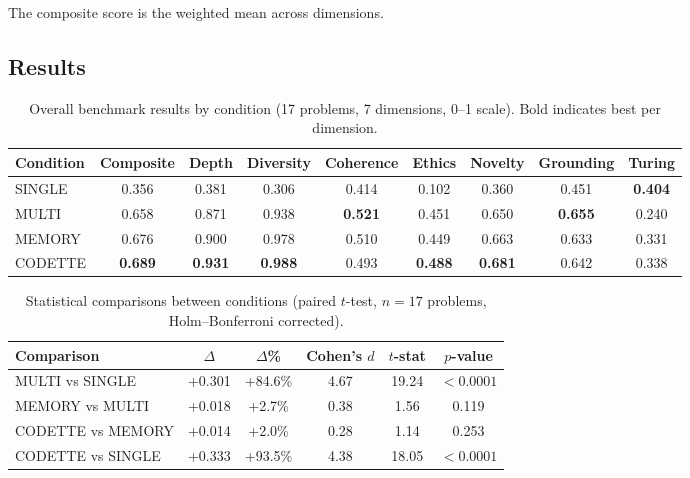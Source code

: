 \documentclass[11pt,a4paper]{article}
\begin{document}
The composite score is the weighted mean across dimensions.

\subsection{Results}

\begin{table}[ht]
\centering
\caption{Overall benchmark results by condition (17 problems, 7 dimensions, 0--1 scale). Bold indicates best per dimension.}
\label{tab:results}
\begin{tabular}{lcccccccc}
\toprule
\textbf{Condition} & \textbf{Composite} & \textbf{Depth} & \textbf{Diversity} & \textbf{Coherence} & \textbf{Ethics} & \textbf{Novelty} & \textbf{Grounding} & \textbf{Turing} \\
\midrule
SINGLE  & 0.356 & 0.381 & 0.306 & 0.414 & 0.102 & 0.360 & 0.451 & \textbf{0.404} \\
MULTI   & 0.658 & 0.871 & 0.938 & \textbf{0.521} & 0.451 & 0.650 & \textbf{0.655} & 0.240 \\
MEMORY  & 0.676 & 0.900 & 0.978 & 0.510 & 0.449 & 0.663 & 0.633 & 0.331 \\
CODETTE & \textbf{0.689} & \textbf{0.931} & \textbf{0.988} & 0.493 & \textbf{0.488} & \textbf{0.681} & 0.642 & 0.338 \\
\bottomrule
\end{tabular}
\end{table}

\begin{table}[ht]
\centering
\caption{Statistical comparisons between conditions (paired $t$-test, $n = 17$ problems, Holm--Bonferroni corrected).}
\label{tab:statistics}
\begin{tabular}{lccccc}
\toprule
\textbf{Comparison} & \textbf{$\Delta$} & \textbf{$\Delta$\%} & \textbf{Cohen's $d$} & \textbf{$t$-stat} & \textbf{$p$-value} \\
\midrule
MULTI vs SINGLE             & +0.301 & +84.6\% & 4.67  & 19.24 & $<0.0001$ \\
MEMORY vs MULTI             & +0.018 & +2.7\%  & 0.38  & 1.56  & 0.119 \\
CODETTE vs MEMORY           & +0.014 & +2.0\%  & 0.28  & 1.14  & 0.253 \\
CODETTE vs SINGLE           & +0.333 & +93.5\% & 4.38  & 18.05 & $<0.0001$ \\
\bottomrule
\end{tabular}
\end{table}
\end{document}
